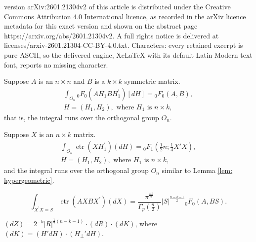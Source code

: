 \documentclass[10pt,a4paper]{amsart}
\begin{document}
version arXiv:2601.21304v2 of this article is distributed under the Creative Commons Attribution 4.0 International licence, as recorded in the arXiv licence metadata for this exact version and shown on the abstract page https://arxiv.org/abs/2601.21304v2. A full rights notice is delivered at licenses/arxiv-2601.21304-CC-BY-4.0.txt. Characters: every retained excerpt is pure ASCII, so the delivered engine, XeLaTeX with its default Latin Modern text font, reports no missing character.
\begin{proposition}\label{lem: hypergeometric} Suppose $ A$ is an $n\times n$ and $ B$ is a $k\times k$ symmetric matrix. 
    \[\begin{aligned}
        \int_{O_n}{}_{0}F_{0}( A H_1 B H_1^{\prime}) [dH] = {}_{0}F_{0}( A, B),\\ 
         H = (H_{1},  H_{2}), \text{ where }  H_1 \text{ is } n \times k,
    \end{aligned}\]
    that is, the integral runs over the orthogonal group $O_n$.
\end{proposition}

\begin{proposition}\label{lem: james55} Suppose $X$ is an $n\times k$ matrix.
    \[\begin{aligned}
        \int_{O_n} \operatorname{etr}( X H_1^{\prime}) (d H) = {}_{0}F_{1}\left(\frac{1}{2}n;\frac{1}{4} X' X\right), \\ 
         H = (H_{1},  H_{2}), \text{ where }  H_1 \text{ is } n \times k,
        \end{aligned}\]
    and the integral runs over the orthogonal group $O_n$ similar to Lemma \ref{lem: hypergeometric}.
\end{proposition}

		\begin{equation*}
			\int_{ X^{\prime}  X= S} \operatorname{etr} ( A  X  B  X^{\prime}) (d  X)= \frac{\pi^{\frac{nk}{2}}}{\varGamma_{p}(\frac{n}{2} )} | S|^{\frac{n-k-1}{2}} {_0}F_0( A,  B S).\label{eq: Khatri1966}
		\end{equation*}\label{lem: Khatri66}

\begin{proposition}\label{prop: herz55}
$(dZ) = 2^{-k} |R|^{\frac{1}{2}(n-k-1)} \cdot (dR) \cdot (dK)$, where $(dK) = {(H'dH)} \cdot {(H_\perp'dH)}$.
\end{proposition}
\end{document}
